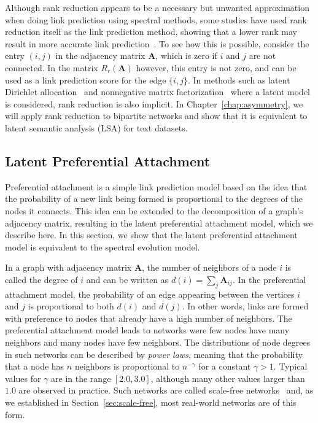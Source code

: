\documentclass[11pt,a4paper]{book}
\newcommand{\syRank}{r}
\begin{document}
Although rank reduction appears to be a necessary but unwanted
approximation when doing link prediction using spectral methods, some
studies have used rank reduction itself as the link prediction method,
showing that a lower rank may result in more accurate link
prediction~\cite{b166,b140}.  To see how this is possible, consider the
entry $(i,j)$ in the adjacency matrix $\mathbf A$, which is zero if 
$i$ and $j$ are not connected.  
In the matrix $R_\syRank(\mathbf A)$ however, this entry is not zero, and can
be used as a link prediction score for the edge $\{i,j\}$.  
In methods such as latent Dirichlet allocation~\cite{b358} and
nonnegative matrix factorization~\cite{b393} where
a latent model is considered, rank reduction is
also implicit.  
In Chapter~\ref{chap:asymmetry}, we will apply rank reduction to
bipartite networks and show that it is equivalent to latent semantic
analysis (LSA) for text datasets. 

\subsection{Latent Preferential Attachment}
\label{sec:latent-preferential-attachment}
Preferential attachment is a simple link prediction model based on the
idea that the probability of a new link being formed is proportional to
the degrees of the nodes it connects.  This idea can be extended to the
decomposition of a graph's adjacency matrix, resulting in the latent
preferential attachment model, which we describe here.  In this section,
we show that the latent preferential
attachment model is equivalent to the spectral evolution model. 

In a graph with adjacency matrix $\mathbf A$, 
the number                      
of neighbors of a node $i$ is called the degree of $i$ 
and can be written as $d(i) = \sum_j \mathbf A_{ij}$.  
In the preferential attachment model, the probability of an edge
appearing between the vertices $i$ and $j$ is proportional to both
$d(i)$ and $d(j)$.  In other words, links are formed with preference to
nodes that already have a high number of neighbors.  The preferential
attachment model leads to networks were few nodes have many neighbors
and many nodes have few neighbors.  The distributions of node degrees in
such networks can be described by \emph{power laws}, meaning that the
probability that a node has $n$ neighbors is proportional to
$n^{-\gamma}$ for a constant $\gamma > 1$.  Typical values for $\gamma$
are in the range $[2.0,3.0]$, although many other values larger than $1.0$
are observed in practice. 
Such networks are called scale-free networks~\cite{b439} and, as we
established in Section~\ref{sec:scale-free}, most real-world networks
are of this form. 
\end{document}
